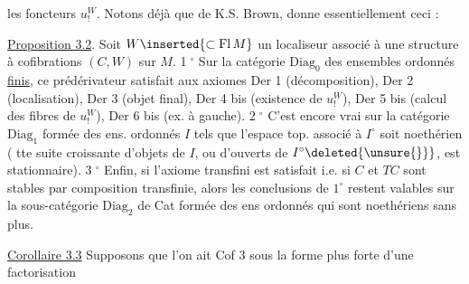 les foncteurs $u^{W}_{!}$. Notons déjà que  de
K.S. Brown,  donne essentiellement ceci :

{\reversemarginpar{}}

\uline{Proposition 3.2}.  Soit $W\inserted{\subset\mathrm{Fl}\,M}$  un localiseur
associé à une structure à cofibrations
$(C,W)$ sur $M$.  \textcircled{\scriptsize 1$^\circ$} Sur la catégorie $\mathrm{Diag}_0$ des
ensembles ordonnés \uline{finis}, ce prédérivateur
satisfait aux axiomes Der 1 (décomposition),
Der 2 (localisation), Der 3 (objet final),
Der 4 bis (existence de $u^{W}_{!}$), Der 5 bis
(calcul des fibres de $u^{W}_{!}$), Der 6 bis
(ex.  à gauche). \textcircled{\scriptsize 2$^\circ$} C'est encore vrai
sur la catégorie $\mathrm{Diag}_1$  formée des ens.
ordonnés $I$  tels que l'espace
top. associé à $I^\circ$ soit noethérien ( tte
suite croissante d'objets de $I$, ou d'ouverts
de $I^\circ\deleted{\unsure{\}}}$, est stationnaire). \textcircled{\scriptsize 3$^\circ$} Enfin, si
 l'axiome transfini  est satisfait i.e.
si $C$ et $TC$ sont stables par composition
transfinie, alors les conclusions de $1^\circ$ restent
valables sur la  sous-catégorie  $\mathrm{Diag}_2$ de
Cat formée des ens ordonnés qui sont
noethériens sans plus.

\uline{Corollaire 3.3} Supposons que l'on ait Cof 3 sous
la forme plus forte d'une factorisation
